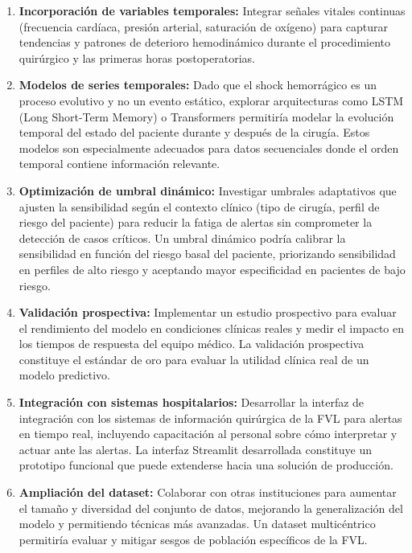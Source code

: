 \begin{enumerate}
    \item \textbf{Incorporación de variables temporales:} Integrar señales vitales continuas (frecuencia cardíaca, presión arterial, saturación de oxígeno) para capturar tendencias y patrones de deterioro hemodinámico durante el procedimiento quirúrgico y las primeras horas postoperatorias.

    \item \textbf{Modelos de series temporales:} Dado que el shock hemorrágico es un proceso evolutivo y no un evento estático, explorar arquitecturas como LSTM (Long Short-Term Memory) o Transformers permitiría modelar la evolución temporal del estado del paciente durante y después de la cirugía. Estos modelos son especialmente adecuados para datos secuenciales donde el orden temporal contiene información relevante.

    \item \textbf{Optimización de umbral dinámico:} Investigar umbrales adaptativos que ajusten la sensibilidad según el contexto clínico (tipo de cirugía, perfil de riesgo del paciente) para reducir la fatiga de alertas sin comprometer la detección de casos críticos. Un umbral dinámico podría calibrar la sensibilidad en función del riesgo basal del paciente, priorizando sensibilidad en perfiles de alto riesgo y aceptando mayor especificidad en pacientes de bajo riesgo.

    \item \textbf{Validación prospectiva:} Implementar un estudio prospectivo para evaluar el rendimiento del modelo en condiciones clínicas reales y medir el impacto en los tiempos de respuesta del equipo médico. La validación prospectiva constituye el estándar de oro para evaluar la utilidad clínica real de un modelo predictivo.

    \item \textbf{Integración con sistemas hospitalarios:} Desarrollar la interfaz de integración con los sistemas de información quirúrgica de la FVL para alertas en tiempo real, incluyendo capacitación al personal sobre cómo interpretar y actuar ante las alertas. La interfaz Streamlit desarrollada constituye un prototipo funcional que puede extenderse hacia una solución de producción.

    \item \textbf{Ampliación del dataset:} Colaborar con otras instituciones para aumentar el tamaño y diversidad del conjunto de datos, mejorando la generalización del modelo y permitiendo técnicas más avanzadas. Un dataset multicéntrico permitiría evaluar y mitigar sesgos de población específicos de la FVL.
\end{enumerate}

\newpage

